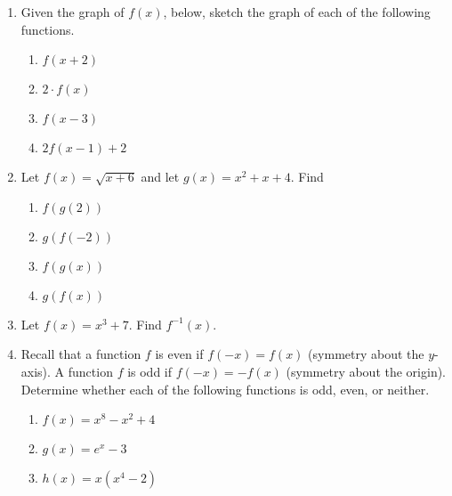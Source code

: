 \documentclass[11pt]{article}
\begin{document}
\drawtitle

\begin{enumerate}
\item Given the graph of $f(x)$, below, sketch the graph of each of the
  following functions.
  \begin{center}
  \end{center}
  \begin{multicols*}{2} %
    \begin{enumerate}
    \item $f(x+2)$
      \vfill
    \item $2\cdot f(x)$
      \vfill
      \columnbreak
    \item $f(x-3)$
      \vfill
    \item $2 f(x-1) +2$
    \end{enumerate}
  \end{multicols*}

  \newpage

\item Let $f(x) = \sqrt{x + 6}$ and let $g(x) = x^2 + x + 4$.  Find
  \begin{enumerate}
  \item $f(g(2))$
    \vfill
  \item $g(f(-2))$
    \vfill
  \item $f(g(x))$
    \vfill
  \item $g(f(x))$
    \vfill
  \end{enumerate}

\item Let $f(x) = x^3 + 7$.  Find $f^{-1}(x)$.

  \vfill\vfill\vfill

  \newpage

\item Recall that a function $f$ is even if $f(-x) = f(x)$ (symmetry
  about the $y$-axis). A function $f$ is odd if $f(-x) = -f(x)$
  (symmetry about the origin).  Determine whether each of the
  following functions is odd, even, or neither.
  \begin{enumerate}
  \item $f(x) = x^8 - x^2 +4$
    \vfill
  \item $g(x) = e^x -3$
    \vfill
  \item $h(x) = x(x^4-2)$
    \vfill
  \end{enumerate}


\end{enumerate}
\end{document}

